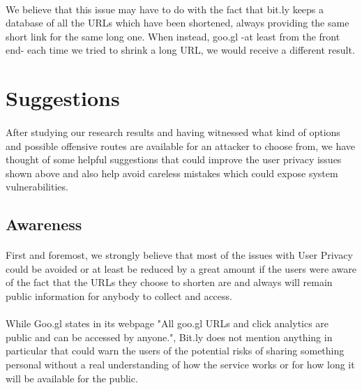 \documentclass[12pt]{article}
\begin{document}
\paragraph{}
 We believe that this issue may have to do with the fact that bit.ly keeps a database of all the URLs which have been shortened, always providing the same short link for the same long one. When instead, goo.gl -at least from the front end- each time we tried to shrink a long URL, we would receive a different result.


\newpage
\section{Suggestions}

\paragraph{}
 After studying our research results and having witnessed what kind of options and possible offensive routes are available for an attacker to choose from, we have thought of some helpful suggestions that could improve the user privacy issues shown above and also help avoid careless mistakes which could expose system vulnerabilities.

\subsection{Awareness}

\paragraph{}
 First and foremost, we strongly believe that most of the issues with User Privacy could be avoided or at least be reduced by a great amount if the users were aware of the fact that the URLs they choose to shorten are and always will remain public information for anybody to collect and access.
 
\paragraph{}
 While Goo.gl states in its webpage "All goo.gl URLs and click analytics are public and can be accessed by anyone.", Bit.ly does not mention anything in particular that could warn the users of the potential risks of sharing something personal without a real understanding of how the service works or for how long it will be available for the public.
\end{document}
